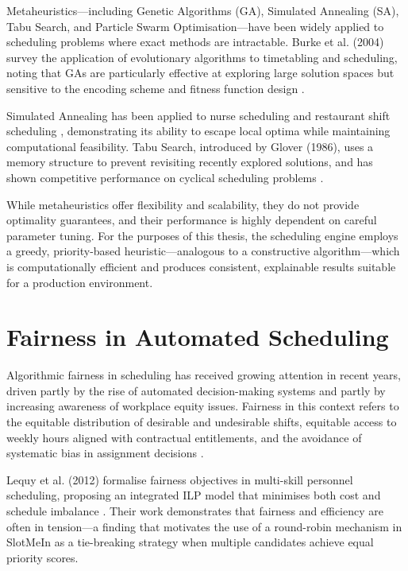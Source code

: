 \documentclass[12pt,a4paper]{report}
\begin{document}
Metaheuristics—including Genetic Algorithms (GA), Simulated Annealing (SA), Tabu Search, and Particle Swarm Optimisation—have been widely applied to scheduling problems where exact methods are intractable. Burke et al. (2004) survey the application of evolutionary algorithms to timetabling and scheduling, noting that GAs are particularly effective at exploring large solution spaces but sensitive to the encoding scheme and fitness function design \cite{burke_et_al_2004}.

Simulated Annealing has been applied to nurse scheduling \cite{aickelin_dowsland_2000} and restaurant shift scheduling \cite{thompson_1997}, demonstrating its ability to escape local optima while maintaining computational feasibility. Tabu Search, introduced by Glover (1986), uses a memory structure to prevent revisiting recently explored solutions, and has shown competitive performance on cyclical scheduling problems \cite{glover_1986}.

While metaheuristics offer flexibility and scalability, they do not provide optimality guarantees, and their performance is highly dependent on careful parameter tuning. For the purposes of this thesis, the scheduling engine employs a greedy, priority-based heuristic—analogous to a constructive algorithm—which is computationally efficient and produces consistent, explainable results suitable for a production environment.

\section{Fairness in Automated Scheduling}

Algorithmic fairness in scheduling has received growing attention in recent years, driven partly by the rise of automated decision-making systems and partly by increasing awareness of workplace equity issues. Fairness in this context refers to the equitable distribution of desirable and undesirable shifts, equitable access to weekly hours aligned with contractual entitlements, and the avoidance of systematic bias in assignment decisions \cite{lequy_et_al_2012}.

Lequy et al. (2012) formalise fairness objectives in multi-skill personnel scheduling, proposing an integrated ILP model that minimises both cost and schedule imbalance \cite{lequy_et_al_2012}. Their work demonstrates that fairness and efficiency are often in tension—a finding that motivates the use of a round-robin mechanism in SlotMeIn as a tie-breaking strategy when multiple candidates achieve equal priority scores.
\end{document}
